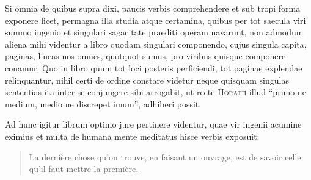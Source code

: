\documentclass[11pt]{article}
\newcommand{\scn}[1]{\textsc{#1}}
\begin{document}
Si omnia de quibus supra dixi, paucis verbis comprehendere et sub tropi forma exponere licet, permagna illa studia atque certamina, quibus per tot saecula viri summo ingenio et singulari sagacitate praediti operam navarunt, non admodum aliena mihi videntur a libro quodam singulari componendo, cujus singula capita, paginas, lineas nos omnes, quotquot sumus, pro viribus quisque componere conamur. Quo in libro quum tot loci posteris perficiendi, tot paginae explendae relinquantur, nihil certi de ordine constare videtur neque quisquam singulas sententias ita inter se conjungere sibi arrogabit, ut recte \scn{Horatii} illud ``primo ne medium, medio ne discrepet imum'', adhiberi possit.

Ad hunc igitur librum optimo jure pertinere videntur, quae vir ingenii acumine eximius et multa de humana mente meditatus hisce verbis exposuit:
\begin{quote}
La dernière chose qu'on trouve, en faisant un ouvrage, est de savoir celle qu'il faut mettre la première.
\end{quote}
\end{document}
